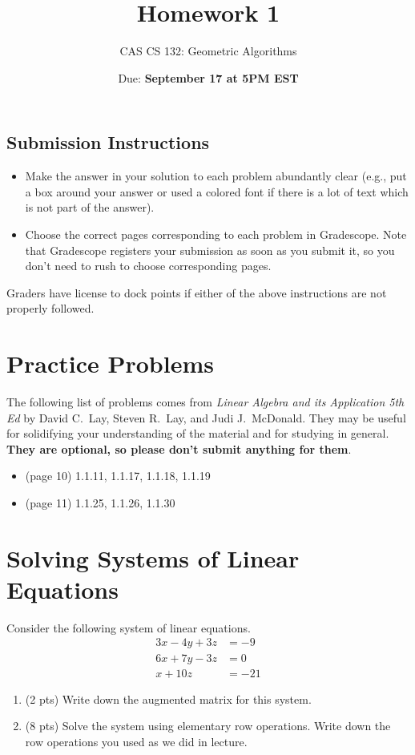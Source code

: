 \documentclass{article}
\title{
  Homework 1
}
\author{CAS CS 132: Geometric Algorithms}
\date{Due: \textbf{September 17 at 5PM EST}}
\theoremstyle{remark}
\begin{document}
\maketitle

\subsection*{Submission Instructions}
\begin{itemize}
\item Make the answer in your solution to each problem abundantly clear (e.g., put a box around your answer or used a colored font if there is a lot of text which is not part of the answer).
\item Choose the correct pages corresponding to each problem in Gradescope. Note that Gradescope registers your submission as soon as you submit it, so you don't need to rush to choose corresponding pages.
\end{itemize}
Graders have license to dock points if either of the above instructions are not properly followed.

\section*{Practice Problems}

The following list of problems comes from \textit{Linear Algebra and its Application 5th Ed} by David C.\ Lay, Steven R.\ Lay, and Judi J.\ McDonald.
They may be useful for solidifying your understanding of the material and for studying in general.
\textbf{They are optional, so please don't submit anything for them}.

\begin{itemize}
\item
  (page 10) 1.1.11, 1.1.17, 1.1.18, 1.1.19
\item
  (page 11) 1.1.25, 1.1.26, 1.1.30
\end{itemize}

\pagebreak
\section{Solving Systems of Linear Equations}

Consider the following system of linear equations.
\begin{align*}
  3x - 4y + 3z &= -9 \\
  6x + 7y - 3z &= 0 \\
  x + 10z &= -21
\end{align*}
\begin{enumerate}
\item (2 pts) Write down the augmented matrix for this system.
\item (8 pts)
  Solve the system using elementary row operations.
  Write down the row operations you used as we did in lecture.
\end{enumerate}
\end{document}
